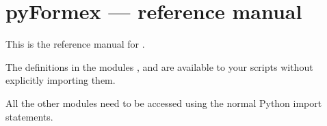 
\chapter{pyFormex --- reference manual}
\label{cha:reference}

This is the reference manual for \pyformex.


The definitions in the modules ,  and  are available to your \pyformex scripts without explicitly importing them.

All the other modules need to be accessed using the normal Python import statements.







